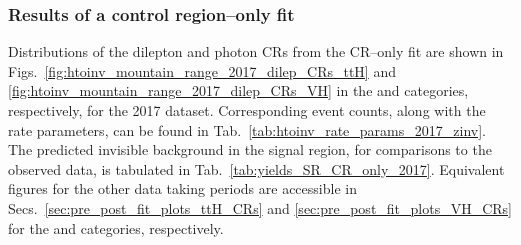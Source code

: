 



\subsubsection{Results of a control region--only fit}
\label{subsubsec:htoinv_zinv_CR_only_fit}

Distributions of the dilepton and photon \glspl{CR} from the \gls{CR}--only fit are shown in Figs.~\ref{fig:htoinv_mountain_range_2017_dilep_CRs_ttH} and \ref{fig:htoinv_mountain_range_2017_dilep_CRs_VH} in the \ttH and \VH categories, respectively, for the 2017 dataset. Corresponding event counts, along with the rate parameters, can be found in Tab.~\ref{tab:htoinv_rate_params_2017_zinv}. The predicted invisible \PZ background in the signal region, for comparisons to the observed data, is tabulated in Tab.~\ref{tab:yields_SR_CR_only_2017}. Equivalent figures for the other data taking periods are accessible in Secs.~\ref{sec:pre_post_fit_plots_ttH_CRs} and \ref{sec:pre_post_fit_plots_VH_CRs} for the \ttH and \VH categories, respectively.

